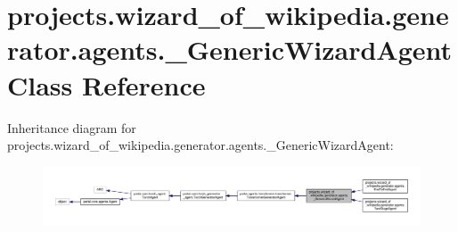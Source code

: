 \hypertarget{classprojects_1_1wizard__of__wikipedia_1_1generator_1_1agents_1_1__GenericWizardAgent}{}\section{projects.\+wizard\+\_\+of\+\_\+wikipedia.\+generator.\+agents.\+\_\+\+Generic\+Wizard\+Agent Class Reference}
\label{classprojects_1_1wizard__of__wikipedia_1_1generator_1_1agents_1_1__GenericWizardAgent}


Inheritance diagram for projects.\+wizard\+\_\+of\+\_\+wikipedia.\+generator.\+agents.\+\_\+\+Generic\+Wizard\+Agent\+:
\nopagebreak
\begin{figure}[H]
\begin{center}
\leavevmode
\includegraphics[width=350pt]{classprojects_1_1wizard__of__wikipedia_1_1generator_1_1agents_1_1__GenericWizardAgent__inherit__graph}
\end{center}
\end{figure}


